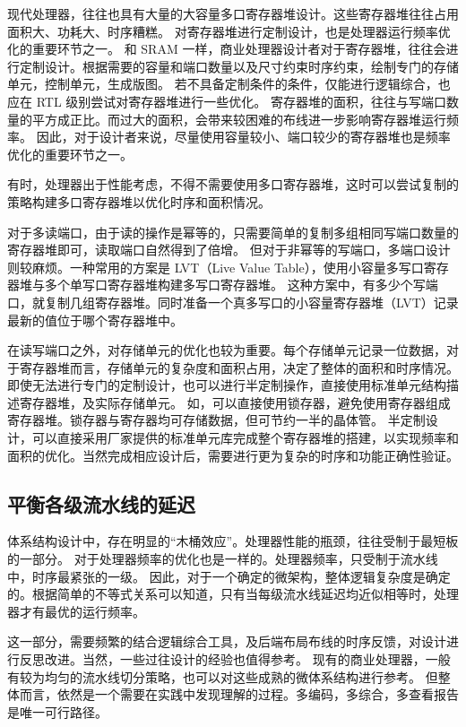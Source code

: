 现代处理器，往往也具有大量的大容量多口寄存器堆设计。这些寄存器堆往往占用面积大、功耗大、时序糟糕。
对寄存器堆进行定制设计，也是处理器运行频率优化的重要环节之一。
和 SRAM 一样，商业处理器设计者对于寄存器堆，往往会进行定制设计。根据需要的容量和端口数量以及尺寸约束时序约束，绘制专门的存储单元，控制单元，生成版图。
若不具备定制条件的条件，仅能进行逻辑综合，也应在 RTL 级别尝试对寄存器堆进行一些优化。
寄存器堆的面积，往往与写端口数量的平方成正比。而过大的面积，会带来较困难的布线进一步影响寄存器堆运行频率。
因此，对于设计者来说，尽量使用容量较小、端口较少的寄存器堆也是频率优化的重要环节之一。

有时，处理器出于性能考虑，不得不需要使用多口寄存器堆，这时可以尝试复制的策略构建多口寄存器堆以优化时序和面积情况。

对于多读端口，由于读的操作是幂等的，只需要简单的复制多组相同写端口数量的寄存器堆即可，读取端口自然得到了倍增。
但对于非幂等的写端口，多端口设计则较麻烦。一种常用的方案是 LVT（Live Value Table），使用小容量多写口寄存器堆与多个单写口寄存器堆构建多写口寄存器堆。
这种方案中，有多少个写端口，就复制几组寄存器堆。同时准备一个真多写口的小容量寄存器堆（LVT）记录最新的值位于哪个寄存器堆中。

在读写端口之外，对存储单元的优化也较为重要。每个存储单元记录一位数据，对于寄存器堆而言，存储单元的复杂度和面积占用，决定了整体的面积和时序情况。
即使无法进行专门的定制设计，也可以进行半定制操作，直接使用标准单元结构描述寄存器堆，及实际存储单元。
如，可以直接使用锁存器，避免使用寄存器组成寄存器堆。锁存器与寄存器均可存储数据，但可节约一半的晶体管。
半定制设计，可以直接采用厂家提供的标准单元库完成整个寄存器堆的搭建，以实现频率和面积的优化。当然完成相应设计后，需要进行更为复杂的时序和功能正确性验证。

\subsection{平衡各级流水线的延迟}\label{sec:11-advanced-cpu-003}

体系结构设计中，存在明显的``木桶效应''。处理器性能的瓶颈，往往受制于最短板的一部分。
对于处理器频率的优化也是一样的。处理器频率，只受制于流水线中，时序最紧张的一级。
因此，对于一个确定的微架构，整体逻辑复杂度是确定的。根据简单的不等式关系可以知道，只有当每级流水线延迟均近似相等时，处理器才有最优的运行频率。

这一部分，需要频繁的结合逻辑综合工具，及后端布局布线的时序反馈，对设计进行反思改进。当然，一些过往设计的经验也值得参考。
现有的商业处理器，一般有较为均匀的流水线切分策略，也可以对这些成熟的微体系结构进行参考。
但整体而言，依然是一个需要在实践中发现理解的过程。多编码，多综合，多查看报告是唯一可行路径。

